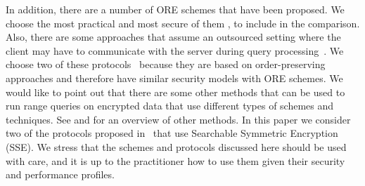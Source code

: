 		In addition, there are a number of ORE schemes \cite{ore-original, clww-ore, lewi-wu-ore, parameter-hiding-ore, parameter-hiding-ore, ore-learning, ore-partial, ore-multi-client} that have been proposed. %
		We choose the most practical and most secure of them \cite{clww-ore, lewi-wu-ore, parameter-hiding-ore}, to include in the comparison. %
		Also, there are some approaches that assume an outsourced setting where the client may have to communicate with the server during query processing~\cite{pope, florian-protocol, secure-queries-overview, practical-range-search}.
		We choose two of these protocols~\cite{pope, florian-protocol} because they are based on order-preserving approaches and therefore have similar security models with ORE schemes.
		We would like to point out that there are some other methods that can be used to run range queries on encrypted data that use different types of schemes and techniques.
		See \cite{secure-queries-overview} and \cite{protocols-survey} for an overview of other methods. %
		In this paper we consider two of the protocols proposed in~\cite{practical-range-search} that use Searchable Symmetric Encryption (SSE).
		We stress that the schemes and protocols discussed here should be used with care, and it is up to the practitioner how to use them given their security and performance profiles.
